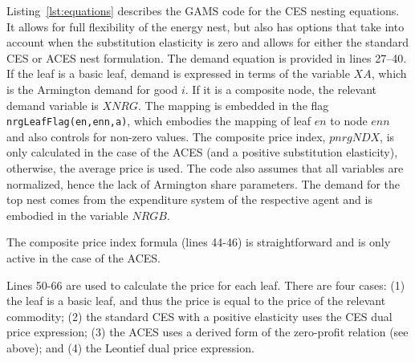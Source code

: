 Listing~\ref{lst:equations} describes the GAMS code for the
CES nesting equations. It allows for
full flexibility of the energy nest, but also has options that take
into account when the substitution elasticity is zero and allows
for either the standard CES or ACES nest formulation.
The demand equation is provided in lines 27--40. If the
leaf is a basic leaf, demand is expressed in terms of the variable
$\mathit{XA}$, which is the Armington demand for good $i$. If
it is a composite node, the relevant demand variable is $\mathit{XNRG}$.
The mapping is embedded in the flag \texttt{nrgLeafFlag(en,enn,a)},
which embodies the mapping of leaf $\mathit{en}$ to node $\mathit{enn}$
and also controls for non-zero values. The composite
price index, $\mathit{pnrgNDX}$, is only calculated in the case
of the ACES (and a positive substitution elasticity), otherwise, the
average price is used. The code also assumes that all variables are normalized,
hence the lack of Armington share parameters. The demand for the top nest
comes from the expenditure system of the respective agent and is embodied
in the variable $\mathit{NRGB}$.

The composite price index formula (lines 44-46) is straightforward and is only active
in the case of the ACES.

Lines 50-66 are used to calculate the price for each leaf. There are four cases: (1) the
leaf is a basic leaf, and thus the price is equal to the price of the relevant commodity; (2) the standard CES with a positive elasticity uses the CES dual price expression; (3) the ACES uses a derived form of the zero-profit relation (see above); and (4) the Leontief dual price expression.

